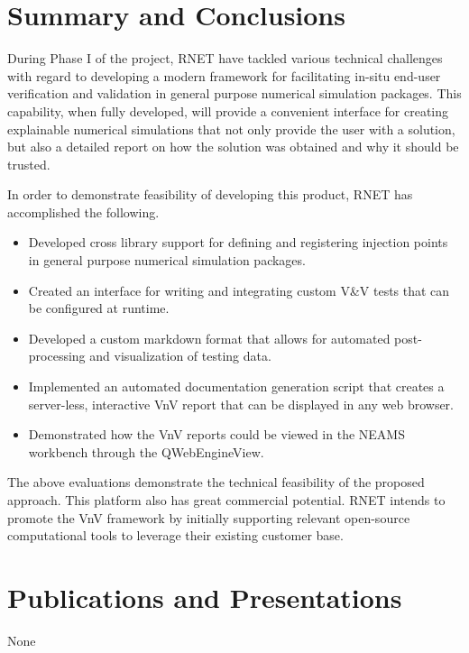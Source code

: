 \section{Summary and Conclusions}

During Phase I of the project, RNET have tackled various technical 
challenges with regard to developing a modern framework for facilitating 
in-situ end-user verification and validation in general purpose numerical 
simulation packages.  This capability, when fully 
developed, will provide a convenient interface for creating explainable numerical 
simulations that not only provide the user with a solution, but also a detailed 
report on how the solution was obtained and why it should be trusted. 

In order to demonstrate 
feasibility of developing this product, RNET has accomplished the 
following.

\begin{itemize}
 \item Developed cross library support for defining and registering injection points in general purpose numerical simulation packages.
 \item Created an interface for writing and integrating custom V\&V tests that can be configured at runtime.
 \item Developed a custom markdown format that allows for automated post-processing and visualization of testing data.
 \item Implemented an automated documentation generation script that creates a server-less, interactive VnV report that can be 
 displayed in any web browser. 
 \item Demonstrated how the VnV reports could be viewed in the NEAMS workbench through the QWebEngineView. 
\end{itemize}

The above evaluations demonstrate the technical feasibility of the proposed 
approach.  This 
platform also has great commercial potential. RNET intends to promote 
the VnV framework by initially supporting relevant open-source computational tools to 
leverage their existing customer base. 


\section{Publications and Presentations}
None


